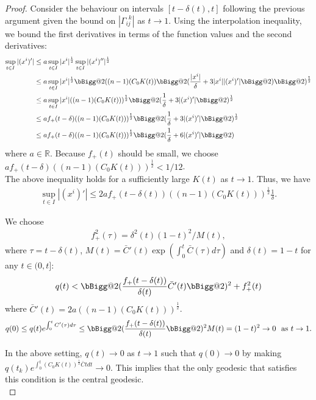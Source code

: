 \documentclass[pdflatex,sn-mathphys-num]{sn-jnl}
\makeatletter
\newcommand{\vast}{\bBigg@{2}}
\theoremstyle{definition}
\makeatother
\begin{document}
\begin{proof}
Consider the behaviour on intervals $[t - \delta(t), t]$ following the previous argument given the bound on $|\Gamma_{ij}^{~~k}|$ as $t \rightarrow 1$. Using the interpolation inequality, we bound the first derivatives in terms of the function values and the second derivatives:
\begin{align*}
    \sup_{t \in I} |(x^i)'| &\leq a\sup_{t \in I}|x^i|^{\frac{1}{2}}\sup_{t \in I}|(x^i)''|^{\frac{1}{2}}\\
    & \leq a\sup_{t \in I}|x^i|^{\frac{1}{2}}\vast((n-1)(C_0K(t))\vast(\frac{|x^i|}{\delta} + 3|x^i||(x^i)'|\vast)\vast)^{\frac{1}{2}}\\
    &\leq a\sup_{t \in I}|x^i|((n-1)(C_0K(t)))^\frac{1}{2}\vast(\frac{1}{\delta} + 3|(x^i)'|\vast)^{\frac{1}{2}}\\
    & \leq af_+(t-\delta)((n-1)(C_0K(t)))^\frac{1}{2}\vast(\frac{1}{\delta} + 3|(x^i)'|\vast)^{\frac{1}{2}}\\
    &\leq af_+(t-\delta)((n-1)(C_0K(t)))^\frac{1}{2}\vast(\frac{1}{\delta} + 6|(x^i)'|\vast)
\end{align*}
where $a \in \mathbb{R}$. Because $f_+(t)$ should be small, we choose $af_+(t-\delta)((n-1)(C_0K(t)))^\frac{1}{2} < 1/12$.\\

The above inequality holds for a sufficiently large $K(t)$ as $t \rightarrow 1$. Thus, we have
\begin{align*}
     \sup_{t \in I} |(x^i)'| \leq 2af_+(t-\delta(t))((n-1)(C_0K(t)))^\frac{1}{2}\frac{1}{\delta}.
\end{align*}

We choose 
\begin{align}\label{f(t)}
    f_+^2(\tau) = \delta^2(t)(1-t)^2/M(t),
\end{align} 
where $\tau = t - \delta(t)$, $M(t) = \bar{C}'(t)\exp(\int_0^t\bar{C}(\tau)d\tau)$ and $\delta(t) = 1 - t$ for any $t \in (0,t]$:
\begin{align*}
    q(t) < \vast(\frac{f_+(t-\delta(t))}{\delta(t)}\bar{C}'(t)\vast)^2 + f_+^2(t)
\end{align*}
where $\bar{C}'(t) = 2a((n-1)(C_0K(t)))^\frac{1}{2}$.
\begin{align*}
    q(0) \leq q(t)e^{\int_0^tC'(\tau)d\tau} \leq \vast(\frac{f_+(t-\delta(t))}{\delta(t)}\vast)^2M(t) = (1-t)^2 \rightarrow 0~~\text{as}~t \rightarrow 1.
\end{align*}

In the above setting, $q({t}) \rightarrow 0$ as $t \rightarrow 1$ such that $q(0) \rightarrow 0$ by making $q(t_k)e^{\int_0^{t}(C_0K(t))^{\frac{1}{2}}\bar{C}tdt} \rightarrow 0$. This implies that the only geodesic that satisfies this condition is the central geodesic.\\


\end{proof}
\end{document}
